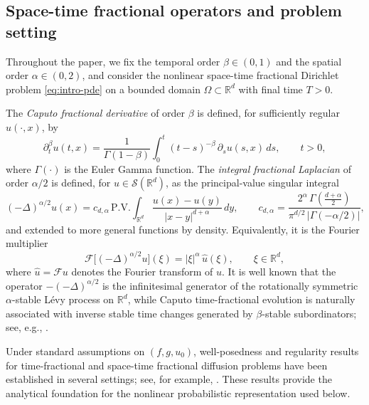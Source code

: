 \documentclass[a4paper,fleqn]{cas-sc}
\begin{document}
\subsection{Space-time fractional operators and problem setting}
\label{subsec:frac-ops}

Throughout the paper, we fix the temporal order $\beta\in(0,1)$ and the spatial order 
$\alpha\in(0,2)$, and consider the nonlinear space-time fractional Dirichlet 
problem \eqref{eq:intro-pde} on a bounded domain $\Omega\subset\mathbb{R}^d$ with 
final time $T>0$. 

 
The \emph{Caputo fractional derivative} of order $\beta$ is defined, for sufficiently regular $u(\cdot,x)$, by
\begin{equation}\label{eq:caputo-def}
\partial_t^\beta u(t,x)
=\frac{1}{\Gamma(1-\beta)}\int_0^{t}(t-s)^{-\beta}\,\partial_s u(s,x)\,ds,
\qquad t>0,
\end{equation}
where $\Gamma(\cdot)$ is the Euler Gamma function. The \emph{integral fractional Laplacian} of order $\alpha/2$ is defined, for $u\in\mathcal{S}(\mathbb{R}^d)$, as the principal-value singular integral
\begin{equation}\label{eq:fraclap-def}
(-\Delta)^{\alpha/2} u(x)
= c_{d,\alpha}\,\mathrm{P.V.}\!\int_{\mathbb{R}^d}\frac{u(x)-u(y)}{|x-y|^{d+\alpha}}\,dy,
\qquad
c_{d,\alpha}=\frac{2^{\alpha}\,\Gamma\!\left(\tfrac{d+\alpha}{2}\right)}{\pi^{d/2}\,\bigl|\Gamma(-\alpha/2)\bigr|},
\end{equation}
and extended to more general functions by density. Equivalently, it is the Fourier multiplier
\begin{equation}\label{eq:fraclap-fourier}
\mathcal{F}\bigl[(-\Delta)^{\alpha/2}u\bigr](\xi)
=
|\xi|^{\alpha}\,\widehat u(\xi),
\qquad \xi\in\mathbb{R}^d,
\end{equation}
where $\widehat u=\mathcal{F}u$ denotes the Fourier transform of $u$. It is well known that the operator $-(-\Delta)^{\alpha/2}$ is the
infinitesimal generator of the rotationally symmetric $\alpha$-stable
L\'evy process on $\mathbb{R}^d$, while Caputo time-fractional evolution is
naturally associated with inverse stable time changes generated by
$\beta$-stable subordinators; see, e.g.,
\cite{MeerschaertBensonSchefflerBaeumer2002StochasticSpaceTime,
BaeumerMeerschaert2001StochasticCauchy}.

Under standard assumptions on $(f,g,u_0)$, well-posedness and regularity results for time-fractional and space-time fractional diffusion problems have been established in several settings; see, for example, \cite{Zacher2009WeakSolutions,KSVZ2016DecayEstimates,RosOtonSerra2014Dirichlet,LeonenkoMeerschaertSikorskii2013Fractional,ChenKimSong2012HeatKernels}. These results provide the analytical foundation for the nonlinear probabilistic representation used below.
\end{document}
